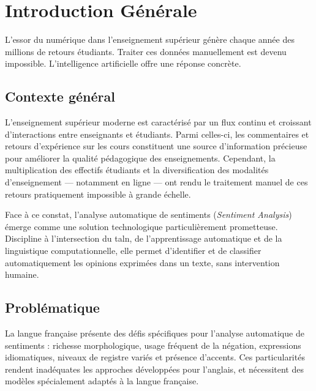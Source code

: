 \chapter*{Introduction Générale}

\vspace{0.3cm}

\begin{infobox}
L'essor du numérique dans l'enseignement supérieur génère chaque année
des millions de retours étudiants. Traiter ces données manuellement est
devenu impossible. L'intelligence artificielle offre une réponse concrète.
\end{infobox}

\vspace{0.5cm}

\section*{Contexte général}

L'enseignement supérieur moderne est caractérisé par un flux continu et
croissant d'interactions entre enseignants et étudiants. Parmi celles-ci,
les commentaires et retours d'expérience sur les cours constituent une
source d'information précieuse pour améliorer la qualité pédagogique des
enseignements. Cependant, la multiplication des effectifs étudiants et la
diversification des modalités d'enseignement — notamment en ligne — ont
rendu le traitement manuel de ces retours pratiquement impossible à grande
échelle.

Face à ce constat, l'analyse automatique de sentiments (\textit{Sentiment
Analysis}) émerge comme une solution technologique particulièrement
prometteuse. Discipline à l'intersection du \acrfull{taln}, de l'apprentissage
automatique et de la linguistique computationnelle, elle permet d'identifier
et de classifier automatiquement les opinions exprimées dans un texte, sans
intervention humaine.

\section*{Problématique}

La langue française présente des défis spécifiques pour l'analyse
automatique de sentiments : richesse morphologique, usage fréquent de la
négation, expressions idiomatiques, niveaux de registre variés et présence
d'accents. Ces particularités rendent inadéquates les approches développées
pour l'anglais, et nécessitent des modèles spécialement adaptés à la langue
française.

